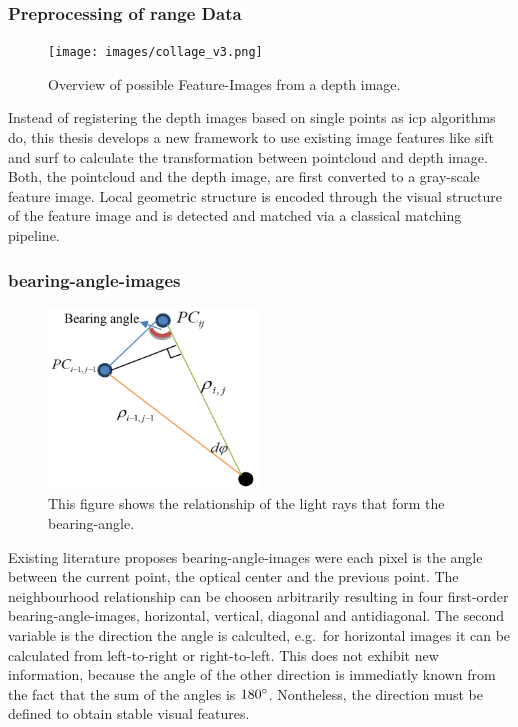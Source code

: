 \documentclass[doktyp=marbeit,fontsize=12pt,sprache=english,draft=true,hausschrift=true]{TUBAFarbeiten}
\begin{document}
\subsubsection{Preprocessing of range Data}\label{preprocessing-of-range-data}

\begin{figure}[H]
    \centering
    \texttt{[image: images/collage\_v3.png]}
    \caption{Overview of possible Feature-Images from a depth image.}
\end{figure}

Instead of registering the depth images based on single points as \gls{icp} algorithms do, this thesis develops a new framework to use existing image features like \Gls{sift} and \Gls{surf} to calculate the transformation between pointcloud and depth image.
Both, the pointcloud and the depth image, are first converted to a gray-scale feature image.
Local geometric structure is encoded through the visual structure of the feature image and is detected and matched via a classical matching pipeline.

\subsubsection{\Glspl{bearing-angle-image}}

\begin{figure}[H]
    \centering
    \includegraphics[width=0.5\textwidth]{images/scetch_bearing.png}
    \caption{This figure shows the relationship of the light rays that form the \gls{bearing-angle}.}
\end{figure}

Existing literature\cite{Scaramuzza2007,Lin2017} proposes \Glspl{bearing-angle-image} were each pixel is the angle between the current point, the optical center and the previous point.
The neighbourhood relationship can be choosen arbitrarily resulting in four first-order \Glspl{bearing-angle-image}, horizontal, vertical, diagonal and antidiagonal.
The second variable is the direction the angle is calculted, e.g.~for horizontal images it can be calculated from left-to-right or right-to-left.
This does not exhibit new information, because the angle of the other direction is immediatly known from the fact that the sum of the angles is $180\degree$.
Nontheless, the direction must be defined to obtain stable visual features.
\end{document}
